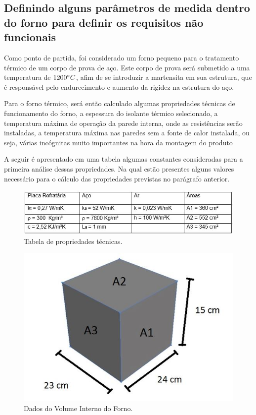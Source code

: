 \subsection{Definindo alguns parâmetros de medida dentro do forno para definir os requisitos não funcionais}

Como ponto de partida, foi considerado um forno pequeno para o tratamento térmico de um corpo de prova de aço. Este corpo de prova será submetido a uma temperatura de $1200\degree C$, afim de se introduzir a martensita em sua estrutura, que é responsável pelo endurecimento e aumento da rigidez na estrutura do aço.

Para o forno térmico, será então calculado algumas propriedades técnicas de funcionamento do forno, a espessura do isolante térmico selecionado, a temperatura máxima de operação da parede interna, onde as resistências serão instaladas, a temperatura máxima nas paredes sem a fonte de calor instalada, ou seja, várias incógnitas muito importantes na hora da montagem do produto

A seguir é apresentado em uma tabela algumas constantes consideradas para a primeira análise dessas propriedades. Na qual estão presentes alguns valores necessário para o cálculo das propriedades previstas no parágrafo anterior.


\begin{figure}[!ht]
	\centering
	\label{tab_constantes}
	\includegraphics[keepaspectratio=true,scale=1.0]{figuras/tab_constantes.JPG}
	\caption{Tabela de propriedades técnicas.}
\end{figure}

\begin{figure}[H]
	\centering
	\label{vol_interno}
	\includegraphics[keepaspectratio=true,scale=0.8]{figuras/vol_interno.JPG}
	\caption{Dados do Volume Interno do Forno.}
\end{figure}

